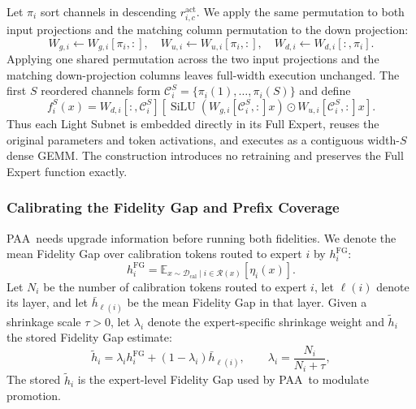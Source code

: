 \documentclass{article}
\newcommand{\PAA}{\textsc{PAA}}
\newcommand{\Rset}{\mathcal{R}}
\begin{document}
Let $\pi_i$ sort channels in descending $r^{\mathrm{act}}_{i,c}$. We apply the same permutation to both input projections and the matching column permutation to the down projection:
\begin{equation}
  W_{g,i}\leftarrow W_{g,i}[\pi_i,:],\quad
  W_{u,i}\leftarrow W_{u,i}[\pi_i,:],\quad
  W_{d,i}\leftarrow W_{d,i}[:,\pi_i].
  \label{eq:channel-reordering}
\end{equation}
Applying one shared permutation across the two input projections and the matching down-projection columns leaves full-width execution unchanged. The first $S$ reordered channels form $\mathcal{C}_i^S=\{\pi_i(1),\ldots,\pi_i(S)\}$ and define
\begin{equation}
  f_i^S(x)=W_{d,i}[:,\mathcal{C}_i^S]
  \left[
  \operatorname{SiLU}(W_{g,i}[\mathcal{C}_i^S,:]x)
  \odot W_{u,i}[\mathcal{C}_i^S,:]x
  \right].
  \label{eq:light-expert}
\end{equation}
Thus each Light Subnet is embedded directly in its Full Expert, reuses the original parameters and token activations, and executes as a contiguous width-$S$ dense GEMM. The construction introduces no retraining and preserves the Full Expert function exactly.

\subsubsection{Calibrating the Fidelity Gap and Prefix Coverage}

\PAA\ needs upgrade information before running both fidelities. We denote the mean Fidelity Gap over calibration tokens routed to expert $i$ by $h_i^{\mathrm{FG}}$:
\begin{equation}
  h_i^{\mathrm{FG}}=
  \mathbb{E}_{x\sim\mathcal{D}_{\mathrm{cal}}\mid i\in\Rset(x)}[\eta_i(x)].
  \label{eq:calibration-gap}
\end{equation}
Let $N_i$ be the number of calibration tokens routed to expert $i$, let $\ell(i)$ denote its layer, and let $\bar h_{\ell(i)}$ be the mean Fidelity Gap in that layer. Given a shrinkage scale $\tau>0$, let $\lambda_i$ denote the expert-specific shrinkage weight and $\widetilde h_i$ the stored Fidelity Gap estimate:
\begin{equation}
  \widetilde h_i=\lambda_i h_i^{\mathrm{FG}}+(1-\lambda_i)\bar h_{\ell(i)},
  \qquad \lambda_i=\frac{N_i}{N_i+\tau},
  \label{eq:shrinkage}
\end{equation}
The stored $\widetilde h_i$ is the expert-level Fidelity Gap used by \PAA\ to modulate promotion.
\end{document}
